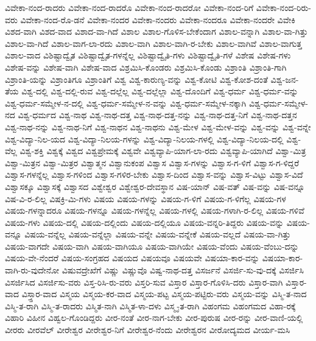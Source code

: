 {ವಿವೇಕಾ-ನಂದ-ರಾದರು
ವಿವೇಕಾ-ನಂದ-ರಾದರೊ
ವಿವೇಕಾ-ನಂದ-ರಾದರೋ
ವಿವೇಕಾ-ನಂದ-ರಿಗೆ
ವಿವೇಕಾ-ನಂದ-ರಿರು-ವರು
ವಿವೇಕಾ-ನಂದ-ರೊ-ಡನೆ
ವಿವೇಕಾ-ನಂದರ
ವಿವೇಕಾ-ನಂದರು
ವಿವೇಕಾ-ನಂದರೂ
ವಿವೇಕಾ-ನಂದರೇ
ವಿವೇಕಿ
ವಿಶದ-ವಾಗಿ
ವಿಶದ-ವಾದ
ವಿಶಾದ-ವಾ-ಗಿದೆ
ವಿಶಾಲ
ವಿಶಾಲ-ಗೊಳಿಸ-ಬೇಕೆಂದಾಗ
ವಿಶಾಲ-ವನ್ನಾಗಿ
ವಿಶಾಲ-ವಾ-ಗಿತ್ತು
ವಿಶಾಲ-ವಾ-ಗಿದೆ
ವಿಶಾಲ-ವಾಗ-ಲಾ-ರದು
ವಿಶಾಲ-ವಾಗಿ
ವಿಶಾಲ-ವಾಗಿ-ರ-ಬೇಕು
ವಿಶಾಲ-ವಾಗಿವೆ
ವಿಶಾಲ-ವಾಗುತ್ತ
ವಿಶಾಲ-ವಾದ
ವಿಶಿಷ್ಟಾದ್ವೈತ
ವಿಶಿಷ್ಟಾದ್ವೈತ-ಗಳನ್ನೆಲ್ಲ
ವಿಶಿಷ್ಟಾದ್ವೈತಿ-ಗಳು
ವಿಶಿಷ್ಟಾದ್ವೈತಿ-ಗಳೆ
ವಿಶೇಷ
ವಿಶೇಷ-ಗಳು
ವಿಶೇಷ-ವನ್ನು
ವಿಶೇಷ-ವಾಗಿ
ವಿಶೇಷ-ವಾದ
ವಿಶ್ರಮಿಸಿ-ಕೊಂಡರು
ವಿಶ್ರಮಿಸಿ-ಕೊಂಡು
ವಿಶ್ರಾಂತಿ
ವಿಶ್ರಾಂತಿ-ಗಾಗಿ
ವಿಶ್ರಾಂತಿ-ಯನ್ನು
ವಿಶ್ರಾಂತಿಗೂ
ವಿಶ್ರಾಂತಿಗೆ
ವಿಶ್ವ
ವಿಶ್ವ-ಕಾರುಣ್ಯ-ವನ್ನು
ವಿಶ್ವ-ಕೋಟಿ
ವಿಶ್ವ-ಕೋಶ-ದಂತೆ
ವಿಶ್ವ-ಜನ-ತೆಯ
ವಿಶ್ವ-ದಲ್ಲಿ
ವಿಶ್ವ-ದಲ್ಲಿ-ರುವ
ವಿಶ್ವ-ದಲ್ಲೆಲ್ಲ
ವಿಶ್ವ-ದಲ್ಲೆಲ್ಲಾ
ವಿಶ್ವ-ದೊಂದಿಗೆ
ವಿಶ್ವ-ಧರ್ಮ
ವಿಶ್ವ-ಧರ್ಮ-ವನ್ನು
ವಿಶ್ವ-ಧರ್ಮ-ಸಮ್ಮೇಳ-ನ-ದಲ್ಲಿ
ವಿಶ್ವ-ಧರ್ಮ-ಸಮ್ಮೇಳ-ನ-ವನ್ನು
ವಿಶ್ವ-ಧರ್ಮ-ಸಮ್ಮೇಳ-ನಕ್ಕಾಗಿ
ವಿಶ್ವ-ಧರ್ಮ-ಸಮ್ಮೇಳ-ನದ
ವಿಶ್ವ-ಧರ್ಮದ
ವಿಶ್ವ-ನಾಥ
ವಿಶ್ವ-ನಾಥ-ದತ್ತ
ವಿಶ್ವ-ನಾಥ-ದತ್ತ-ನನ್ನು
ವಿಶ್ವ-ನಾಥ-ದತ್ತ-ನಿಗೆ
ವಿಶ್ವ-ನಾಥ-ದತ್ತನ
ವಿಶ್ವ-ನಾಥ-ನನ್ನು
ವಿಶ್ವ-ನಾಥ-ನಿಗೆ
ವಿಶ್ವ-ನಾಥನ
ವಿಶ್ವ-ನಾಥನು
ವಿಶ್ವ-ಮೇಳ
ವಿಶ್ವ-ಮೇಳ-ವನ್ನು
ವಿಶ್ವ-ವನ್ನು
ವಿಶ್ವ-ವನ್ನೇ
ವಿಶ್ವ-ವಿದ್ಯಾ-ನಿಲ-ಯದ
ವಿಶ್ವ-ವಿದ್ಯಾ-ನಿಲಯ-ಗಳನ್ನು
ವಿಶ್ವ-ವಿದ್ಯಾ-ನಿಲಯ-ಗಳಲ್ಲಿ
ವಿಶ್ವ-ವಿದ್ಯಾ-ನಿಲಯ-ದಲ್ಲಿ
ವಿಶ್ವ-ವೆಲ್ಲ
ವಿಶ್ವ-ಶಕ್ತಿ
ವಿಶ್ವಕ್ಕೆ
ವಿಶ್ವದ
ವಿಶ್ವಪ್ರೇಮಕ್ಕೆ
ವಿಶ್ವವೇ
ವಿಶ್ವವ್ಯಾಪಿ-ಯಾಗ-ಲಾ-ರದು
ವಿಶ್ವವ್ಯಾಪಿ-ಯಾಗಿದೆ
ವಿಶ್ವಾ-ಮಿತ್ರ
ವಿಶ್ವಾ-ಮಿತ್ರನ
ವಿಶ್ವಾ-ಮಿತ್ರರ
ವಿಶ್ವಾತ್ಮನ
ವಿಶ್ವಾನುಕಂಪ
ವಿಶ್ವಾಸ
ವಿಶ್ವಾಸ-ಗಳನ್ನು
ವಿಶ್ವಾಸ-ಗ-ಳಿಗೆ
ವಿಶ್ವಾಸ-ಗ-ಳಿದ್ದರೆ
ವಿಶ್ವಾಸ-ಗಳನ್ನೆಲ್ಲ
ವಿಶ್ವಾಸ-ಗಳಿಂದ
ವಿಶ್ವಾಸ-ಗಳಿರ-ಬೇಕು
ವಿಶ್ವಾಸ-ದಿಂದ
ವಿಶ್ವಾಸ-ವನ್ನು
ವಿಶ್ವಾಸ-ವಿಟ್ಟು
ವಿಶ್ವಾಸ-ವಿದೆ
ವಿಶ್ವಾಸಕ್ಕೂ
ವಿಶ್ವಾಸಕ್ಕೆ
ವಿಶ್ವಾಸದ
ವಿಶ್ವೇಶ್ವರ
ವಿಶ್ವೇಶ್ವರ-ದೇವಸ್ಥಾನ
ವಿಷ-ಯಾನ್
ವಿಷ-ವತ್
ವಿಷ-ವನ್ನು
ವಿಷ-ವನ್ನೂ
ವಿಷ-ವಿ-ರ-ಲಿಲ್ಲ
ವಿಷಕ್ರಿ-ಮಿ-ಗಳು
ವಿಷಯ
ವಿಷಯ-ಗಳನ್ನು
ವಿಷಯ-ಗ-ಳಿಗೆ
ವಿಷಯ-ಗ-ಳಿಗೆಲ್ಲ
ವಿಷಯ-ಗಳ
ವಿಷಯ-ಗಳನ್ನಾದರೂ
ವಿಷಯ-ಗಳನ್ನೂ
ವಿಷಯ-ಗಳನ್ನೆಲ್ಲ
ವಿಷಯ-ಗಳಲ್ಲಿ
ವಿಷಯ-ಗಳಾಗಿ-ರ-ಲಿಲ್ಲ
ವಿಷಯ-ಗಳಿವೆ
ವಿಷಯ-ಗಳು
ವಿಷಯ-ದಲ್ಲಿ
ವಿಷಯ-ದಲ್ಲಿಂದು
ವಿಷಯ-ದಲ್ಲಿಯೂ
ವಿಷಯ-ವನ್ನರಿ-ತಿದ್ದರು
ವಿಷಯ-ವನ್ನು
ವಿಷಯ-ವನ್ನೂ
ವಿಷಯ-ವನ್ನೆಲ್ಲ
ವಿಷಯ-ವನ್ನೆಲ್ಲಾ
ವಿಷಯ-ವನ್ನೇ
ವಿಷಯ-ವನ್ನೇಕೆ
ವಿಷಯ-ವಲ್ಲದೆ
ವಿಷಯ-ವಾ-ಗಿತ್ತು
ವಿಷಯ-ವಾಗದೇ
ವಿಷಯ-ವಾಗಿ
ವಿಷಯ-ವಾಗಿಯೂ
ವಿಷಯ-ವಾಗಿಯೇ
ವಿಷಯ-ವೆಂದು
ವಿಷಯ-ವೆಂಬು-ದನ್ನು
ವಿಷಯ-ವೇ-ನೆಂದರೆ
ವಿಷಯ-ಸಂಗ್ರಹದ
ವಿಷಯದ
ವಿಷಯವೂ
ವಿಷಯವೇ
ವಿಷಯಾ-ಕಾರ-ವನ್ನು
ವಿಷಯಾ-ಕಾರ-ವಾಗಿ-ರು-ವುದೇನೋ
ವಿಷುವದ್ರೇಖೆಗೆ
ವಿಷ್ಣು
ವಿಷ್ಣುವೊ
ವಿಷ್ವ-ನಾಥ-ದತ್ತ
ವಿಸರ್ಜನೆ
ವಿಸರ್ಜಿ-ಸು-ವು-ದಕ್ಕೆ
ವಿಸರ್ಜಿಸಿ
ವಿಸರ್ಜಿಸಿದ
ವಿಸರ್ಜಿಸು-ವರು
ವಿಸ್ತ-ರಿಸಿ-ರು-ವರು
ವಿಸ್ತರಿ-ಸುವ
ವಿಸ್ತಾರ
ವಿಸ್ತಾರ-ಗೊಳಿಸಿ-ದರು
ವಿಸ್ತಾರ-ವಾಗಿ
ವಿಸ್ತಾರ-ವಾದ
ವಿಸ್ತ್ತಾರ-ವಾದ
ವಿಸ್ಮಯ
ವಿಸ್ಮಯ-ಕರ-ವಾದ
ವಿಸ್ಮಯ-ಪಟ್ಟ
ವಿಸ್ಮಯ-ಪಟ್ಟಿರು-ವರು
ವಿಸ್ಮಯ-ವನ್ನು
ವಿಸ್ಮಿ-ತ-ನಾದ
ವಿಸ್ಮಿ-ತ-ರಾಗಿ
ವಿಸ್ಮಿ-ತ-ರಾದರು
ವಿಸ್ಮಿತ-ನಾಗಿ
ವಿಸ್ಮಿತ-ಳಾ-ದಳು
ವಿಸ್ಮೃ-ತ-ರಾಗಿ
ವಿಹಂಗಮ
ವಿಹಂಗಮದ
ವಿಹಾ-ರಕ್ಕೆ
ವಿಹಾರಿ
ವಿಹೀನ
ವಿಹ್ವಲ-ಗೊಂಡಿದ್ದರು
ವೀರ-ನಂತೆ
ವೀರ-ನಾಗ-ಬೇಕು
ವೀರ-ಪುರುಷ
ವೀರ-ರನ್ನು
ವೀರ-ವಾಣಿ-ಯಲ್ಲಿ
ವೀರರು
ವೀರವೆಲ್
ವೀರೇಶ್ವರ
ವೀರೇಶ್ವರ-ನಿಗೆ
ವೀರೇಶ್ವರ-ನೆಂದು
ವೀರೇಶ್ವರನ
ವೀರೋದ್ಯಮದ
ವೀರ್ಯ-ಮಸಿ
}
